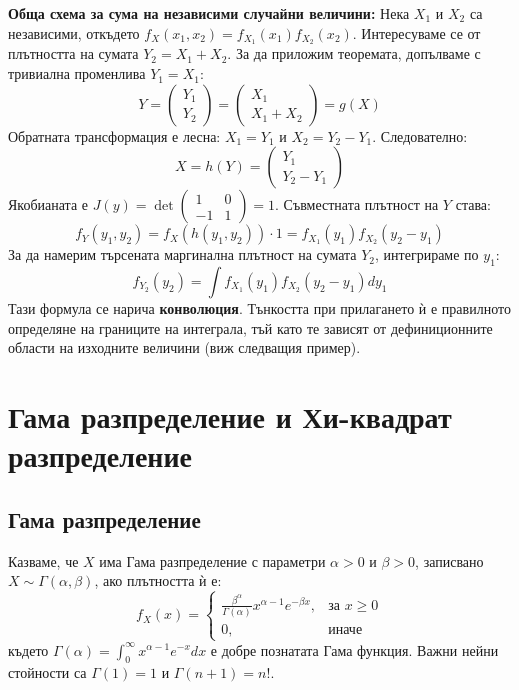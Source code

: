 \documentclass{article}
\begin{document}
\textbf{Обща схема за сума на независими случайни величини:}
Нека $X_1$ и $X_2$ са независими, откъдето $f_X(x_1, x_2) = f_{X_1}(x_1) f_{X_2}(x_2)$. Интересуваме се от плътността на сумата $Y_2 = X_1 + X_2$.
За да приложим теоремата, допълваме с тривиална променлива $Y_1 = X_1$:
\[
Y = \begin{pmatrix} Y_1 \\ Y_2 \end{pmatrix} = \begin{pmatrix} X_1 \\ X_1 + X_2 \end{pmatrix} = g(X)
\]
Обратната трансформация е лесна: $X_1 = Y_1$ и $X_2 = Y_2 - Y_1$. Следователно:
\[
X = h(Y) = \begin{pmatrix} Y_1 \\ Y_2 - Y_1 \end{pmatrix}
\]
Якобианата е $J(y) = \det \begin{pmatrix} 1 & 0 \\ -1 & 1 \end{pmatrix} = 1$.
Съвместната плътност на $Y$ става:
\[
f_Y(y_1, y_2) = f_X(h(y_1, y_2)) \cdot 1 = f_{X_1}(y_1) f_{X_2}(y_2 - y_1)
\]
За да намерим търсената маргинална плътност на сумата $Y_2$, интегрираме по $y_1$:
\[
f_{Y_2}(y_2) = \int f_{X_1}(y_1) f_{X_2}(y_2 - y_1) dy_1
\]
Тази формула се нарича \textbf{конволюция}. Тънкостта при прилагането ѝ е правилното определяне на границите на интеграла, тъй като те зависят от дефиниционните области на изходните величини (виж следващия пример).

\section{Гама разпределение и Хи-квадрат разпределение}

\subsection{Гама разпределение}

Казваме, че $X$ има Гама разпределение с параметри $\alpha > 0$ и $\beta > 0$, записвано $X \sim \Gamma(\alpha, \beta)$, ако плътността ѝ е:
\[
f_X(x) = 
\begin{cases}
\frac{\beta^\alpha}{\Gamma(\alpha)} x^{\alpha - 1} e^{-\beta x}, & \text{за } x \ge 0 \\
0, & \text{иначе}
\end{cases}
\]
където $\Gamma(\alpha) = \int_0^\infty x^{\alpha-1} e^{-x} dx$ е добре познатата Гама функция. Важни нейни стойности са $\Gamma(1) = 1$ и $\Gamma(n+1) = n!$.
\end{document}
